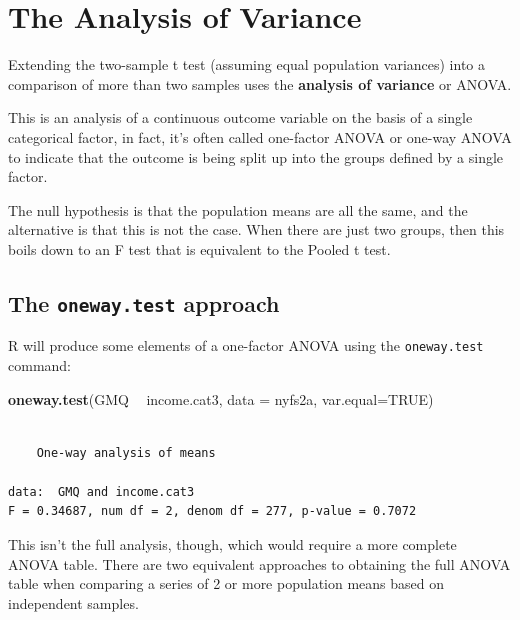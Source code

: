 \documentclass[
]{book}
\newenvironment{Shaded}{\begin{snugshade}}{\end{snugshade}}
\newcommand{\DataTypeTok}[1]{\textcolor[rgb]{0.13,0.29,0.53}{#1}}
\newcommand{\KeywordTok}[1]{\textcolor[rgb]{0.13,0.29,0.53}{\textbf{#1}}}
\newcommand{\NormalTok}[1]{#1}
\newcommand{\OperatorTok}[1]{\textcolor[rgb]{0.81,0.36,0.00}{\textbf{#1}}}
\newcommand{\OtherTok}[1]{\textcolor[rgb]{0.56,0.35,0.01}{#1}}
\newcommand{\StringTok}[1]{\textcolor[rgb]{0.31,0.60,0.02}{#1}}
\begin{document}
\hypertarget{the-analysis-of-variance}{%
\section{The Analysis of Variance}\label{the-analysis-of-variance}}

Extending the two-sample t test (assuming equal population variances) into a comparison of more than two samples uses the \textbf{analysis of variance} or ANOVA.

This is an analysis of a continuous outcome variable on the basis of a single categorical factor, in fact, it's often called one-factor ANOVA or one-way ANOVA to indicate that the outcome is being split up into the groups defined by a single factor.

The null hypothesis is that the population means are all the same, and the alternative is that this is not the case. When there are just two groups, then this boils down to an F test that is equivalent to the Pooled t test.

\hypertarget{the-oneway.test-approach}{%
\subsection{\texorpdfstring{The \texttt{oneway.test} approach}{The oneway.test approach}}\label{the-oneway.test-approach}}

R will produce some elements of a one-factor ANOVA using the \texttt{oneway.test} command:

\begin{Shaded}
\begin{Highlighting}[]
\KeywordTok{oneway.test}\NormalTok{(GMQ }\OperatorTok{~}\StringTok{ }\NormalTok{income.cat3, }\DataTypeTok{data =}\NormalTok{ nyfs2a, }\DataTypeTok{var.equal=}\OtherTok{TRUE}\NormalTok{)}
\end{Highlighting}
\end{Shaded}

\begin{verbatim}

	One-way analysis of means

data:  GMQ and income.cat3
F = 0.34687, num df = 2, denom df = 277, p-value = 0.7072
\end{verbatim}

This isn't the full analysis, though, which would require a more complete ANOVA table. There are two equivalent approaches to obtaining the full ANOVA table when comparing a series of 2 or more population means based on independent samples.
\end{document}
